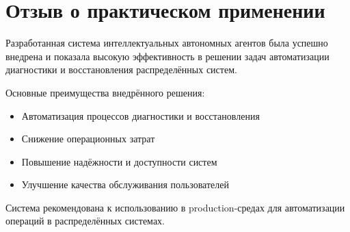 \section{Отзыв о практическом применении}

Разработанная система интеллектуальных автономных агентов была успешно внедрена и показала высокую эффективность в решении задач автоматизации диагностики и восстановления распределённых систем. 

Основные преимущества внедрённого решения:
\begin{itemize}
    \item Автоматизация процессов диагностики и восстановления
    \item Снижение операционных затрат
    \item Повышение надёжности и доступности систем
    \item Улучшение качества обслуживания пользователей
\end{itemize}

Система рекомендована к использованию в production-средах для автоматизации операций в распределённых системах.
